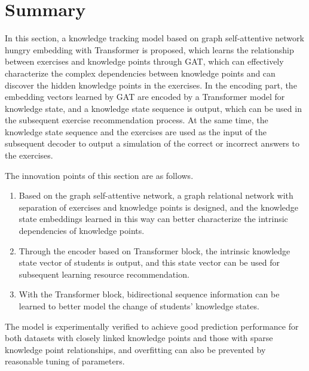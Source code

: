 \section{Summary}
%
In this section, a knowledge tracking model based on graph self-attentive network hungry embedding with Transformer is proposed, which learns the relationship between exercises and knowledge points through GAT, which can effectively characterize the complex dependencies between knowledge points and can discover the hidden knowledge points in the exercises. In the encoding part, the embedding vectors learned by GAT are encoded by a Transformer model for knowledge state, and a knowledge state sequence is output, which can be used in the subsequent exercise recommendation process. At the same time, the knowledge state sequence and the exercises are used as the input of the subsequent decoder to output a simulation of the correct or incorrect answers to the exercises.

The innovation points of this section are as follows.
\begin{enumerate}
	\item Based on the graph self-attentive network, a graph relational network with separation of exercises and knowledge points is designed, and the knowledge state embeddings learned in this way can better characterize the intrinsic dependencies of knowledge points.
	\item Through the encoder based on Transformer block, the intrinsic knowledge state vector of students is output, and this state vector can be used for subsequent learning resource recommendation.
	\item With the Transformer block, bidirectional sequence information can be learned to better model the change of students' knowledge states.
\end{enumerate}

The model is experimentally verified to achieve good prediction performance for both datasets with closely linked knowledge points and those with sparse knowledge point relationships, and overfitting can also be prevented by reasonable tuning of parameters.